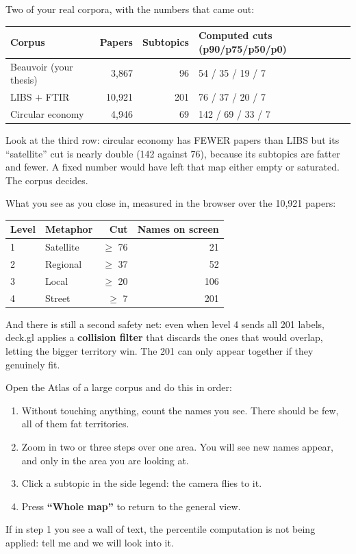 \documentclass[11pt,a4paper]{article}
\begin{document}
Two of your real corpora, with the numbers that came out:

\begin{center}
\begin{tabular}{lrrl}
\hline
Corpus & Papers & Subtopics & Computed cuts (p90/p75/p50/p0) \\
\hline
Beauvoir (your thesis) & 3,867  & 96  & 54 / 35 / 19 / 7 \\
LIBS $+$ FTIR          & 10,921 & 201 & 76 / 37 / 20 / 7 \\
Circular economy       & 4,946  & 69  & 142 / 69 / 33 / 7 \\
\hline
\end{tabular}
\end{center}

Look at the third row: circular economy has FEWER papers than LIBS but its ``satellite'' cut is
nearly double (142 against 76), because its subtopics are fatter and fewer. A fixed number would
have left that map either empty or saturated. The corpus decides.

What you see as you close in, measured in the browser over the 10,921 papers:

\begin{center}
\begin{tabular}{llrr}
\hline
Level & Metaphor & Cut & Names on screen \\
\hline
1 & Satellite & $\geq$ 76 & 21 \\
2 & Regional  & $\geq$ 37 & 52 \\
3 & Local     & $\geq$ 20 & 106 \\
4 & Street    & $\geq$ 7  & 201 \\
\hline
\end{tabular}
\end{center}

And there is still a second safety net: even when level 4 sends all 201 labels, deck.gl applies
a \textbf{collision filter} that discards the ones that would overlap, letting the bigger
territory win. The 201 can only appear together if they genuinely fit.

\begin{practica}
Open the Atlas of a large corpus and do this in order:
\begin{enumerate}
  \item Without touching anything, count the names you see. There should be few, all of them
        fat territories.
  \item Zoom in two or three steps over one area. You will see new names appear, and only in
        the area you are looking at.
  \item Click a subtopic in the side legend: the camera flies to it.
  \item Press \textbf{``Whole map''} to return to the general view.
\end{enumerate}
If in step 1 you see a wall of text, the percentile computation is not being applied: tell me
and we will look into it.
\end{practica}
\end{document}
